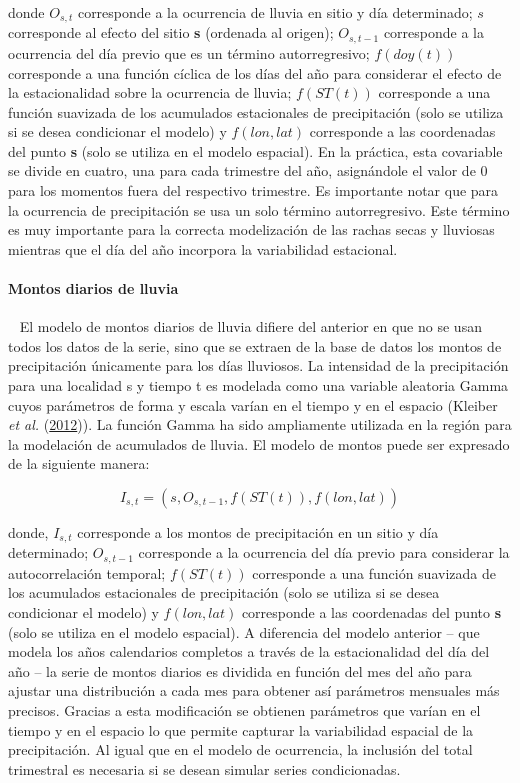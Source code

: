 \documentclass[
  12pt]{article}
\begin{document}
donde \(O_{s,t}\) corresponde a la ocurrencia de lluvia en sitio y día determinado; \(s\) corresponde al efecto del sitio \textbf{s} (ordenada al origen); \(O_{s,t-1}\) corresponde a la ocurrencia del día previo que es un término autorregresivo; \(f(doy(t))\) corresponde a una función cíclica de los días del año para considerar el efecto de la estacionalidad sobre la ocurrencia de lluvia; \(f(ST(t))\) corresponde a una función suavizada de los acumulados estacionales de precipitación (solo se utiliza si se desea condicionar el modelo) y \(f(lon, lat)\) corresponde a las coordenadas del punto \textbf{s} (solo se utiliza en el modelo espacial). En la práctica, esta covariable se divide en cuatro, una para cada trimestre del año, asignándole el valor de 0 para los momentos fuera del respectivo trimestre. Es importante notar que para la ocurrencia de precipitación se usa un solo término autorregresivo. Este término es muy importante para la correcta modelización de las rachas secas y lluviosas mientras que el día del año incorpora la variabilidad estacional.

\hypertarget{montos-diarios-de-lluvia}{%
\paragraph{Montos diarios de lluvia}\label{montos-diarios-de-lluvia}}

~
El modelo de montos diarios de lluvia difiere del anterior en que no se usan todos los datos de la serie, sino que se extraen de la base de datos los montos de precipitación únicamente para los días lluviosos. La intensidad de la precipitación para una localidad s y tiempo t es modelada como una variable aleatoria Gamma cuyos parámetros de forma y escala varían en el tiempo y en el espacio (Kleiber \emph{et al.} (\protect\hyperlink{ref-RN3539}{2012})). La función Gamma ha sido ampliamente utilizada en la región para la modelación de acumulados de lluvia. El modelo de montos puede ser expresado de la siguiente manera:

\[
I_{s,t} = (s, O_{s,t-1}, f(ST(t)), f(lon, lat))
\]

donde, \(I_{s,t}\) corresponde a los montos de precipitación en un sitio y día determinado; \(O_{s,t-1}\) corresponde a la ocurrencia del día previo para considerar la autocorrelación temporal; \(f(ST(t))\) corresponde a una función suavizada de los acumulados estacionales de precipitación (solo se utiliza si se desea condicionar el modelo) y \(f(lon, lat)\) corresponde a las coordenadas del punto \textbf{s} (solo se utiliza en el modelo espacial).
A diferencia del modelo anterior -- que modela los años calendarios completos a través de la estacionalidad del día del año -- la serie de montos diarios es dividida en función del mes del año para ajustar una distribución a cada mes para obtener así parámetros mensuales más precisos. Gracias a esta modificación se obtienen parámetros que varían en el tiempo y en el espacio lo que permite capturar la variabilidad espacial de la precipitación. Al igual que en el modelo de ocurrencia, la inclusión del total trimestral es necesaria si se desean simular series condicionadas.
\end{document}
